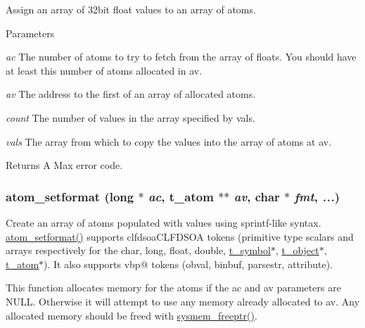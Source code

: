 Assign an array of 32bit float values to an array of atoms. 
\begin{DoxyParams}{Parameters}
\item[{\em ac}]The number of atoms to try to fetch from the array of floats. You should have at least this number of atoms allocated in av. \item[{\em av}]The address to the first of an array of allocated atoms. \item[{\em count}]The number of values in the array specified by vals. \item[{\em vals}]The array from which to copy the values into the array of atoms at av. \end{DoxyParams}
\begin{DoxyReturn}{Returns}
A Max error code. 
\end{DoxyReturn}
\hypertarget{group__atom_ga7a00fdf0699ae5176d39d7ddc3529bf0}{
\subsubsection[{atom\_\-setformat}]{ atom\_\-setformat (long $\ast$ {\em ac}, \/  {\bf t\_\-atom} $\ast$$\ast$ {\em av}, \/  char $\ast$ {\em fmt}, \/   {\em ...})}}
\label{group__atom_ga7a00fdf0699ae5176d39d7ddc3529bf0}


Create an array of atoms populated with values using sprintf-\/like syntax. \hyperlink{group__atom_ga7a00fdf0699ae5176d39d7ddc3529bf0}{atom\_\-setformat()} supports clfdsoaCLFDSOA tokens (primitive type scalars and arrays respectively for the char, long, float, double, \hyperlink{structt__symbol}{t\_\-symbol}$\ast$, \hyperlink{structt__object}{t\_\-object}$\ast$, \hyperlink{structt__atom}{t\_\-atom}$\ast$). It also supports vbp@ tokens (obval, binbuf, parsestr, attribute).

This function allocates memory for the atoms if the ac and av parameters are NULL. Otherwise it will attempt to use any memory already allocated to av. Any allocated memory should be freed with \hyperlink{group__memory_ga200c82639e547869db1f3887d17102d3}{sysmem\_\-freeptr()}.


